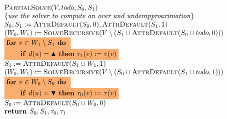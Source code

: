 \documentclass{article}
\newcommand{\If}{\text{\textbf{if }}}
\newcommand{\Do}{\text{\textbf{ do }}}
\newcommand{\Then}{\text{\textbf{ then }}}
\newcommand{\For}{\text{\textbf{for }}}
\newcommand{\Return}{\text{\textbf{return }}}
\begin{document}
\begin{equation*}
\begin{array}{l}
\textsc{PartialSolve}(V,todo,S_0,S_1)\\
\{\textit{use the solver to compute an over and underapproaximation}\}\\
S_0,S_1 := \textsc{AttrDefault}(S_0, 0), \textsc{AttrDefault}(S_1,1) \\
(W_0,W_1) := \textsc{SolveRecursive}(V \setminus (S_1 \cup \textsc{AttrDefault}(S_0 \cup todo,0)))\\

\colorbox{Apricot}{$ \For v \in W_1 \setminus S_{1} \Do $} \\
\colorbox{Apricot}{$ \qquad \If d(u) = \blacktriangle \Then \tau_{1}(v) := \tau(v) $} \\
S_1 := \textsc{AttrDefault}(S_1 \cup W_1,1) \\

(W_0,W_1) := \textsc{SolveRecursive}(V \setminus (S_0 \cup \textsc{AttrDefault}(S_1 \cup todo,1)))\\
\colorbox{Apricot}{$ \For v \in W_0 \setminus S_{0} \Do $} \\
\colorbox{Apricot}{$ \qquad \If d(u) = \blacktriangledown \Then \tau_{0}(v) := \tau(v) $} \\
S_0 := \textsc{AttrDefault}(S_0 \cup W_0,0) \\
\Return S_0, S_1, \tau_0,\tau_1
\end{array}
\end{equation*}
\end{document}
